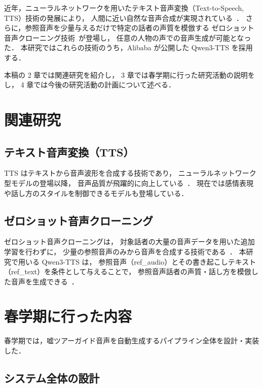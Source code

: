 \documentclass[uplatex,a4paper,10pt,twocolumn]{jsarticle}
\begin{document}
近年，ニューラルネットワークを用いたテキスト音声変換（Text-to-Speech, TTS）技術の発展により，
人間に近い自然な音声合成が実現されている~\cite{ref_tts}．
さらに，参照音声を少量与えるだけで特定の話者の声質を模倣する
ゼロショット音声クローニング技術~\cite{ref_zero_shot}が登場し，
任意の人物の声での音声生成が可能となった．
本研究ではこれらの技術のうち，Alibaba が公開した Qwen3-TTS を採用する．

本稿の 2 章では関連研究を紹介し，
3 章では春学期に行った研究活動の説明をし，
4 章では今後の研究活動の計画について述べる．

\section{関連研究}

\subsection{テキスト音声変換（TTS）}

TTS はテキストから音声波形を合成する技術であり，
ニューラルネットワーク型モデルの登場以降，
音声品質が飛躍的に向上している~\cite{ref_tts}．
現在では感情表現や話し方のスタイルを制御できるモデルも登場している．

\subsection{ゼロショット音声クローニング}

ゼロショット音声クローニングは，
対象話者の大量の音声データを用いた追加学習を行わずに，
少量の参照音声のみから音声を合成する技術である~\cite{ref_zero_shot}．
本研究で用いる Qwen3-TTS は，
参照音声（ref\_audio）とその書き起こしテキスト（ref\_text）を条件として与えることで，
参照音声話者の声質・話し方を模倣した音声を生成できる~\cite{ref_qwen3tts}．


\section{春学期に行った内容}

春学期では，嘘ツアーガイド音声を自動生成するパイプライン全体を設計・実装した．

\subsection{システム全体の設計}
\end{document}

